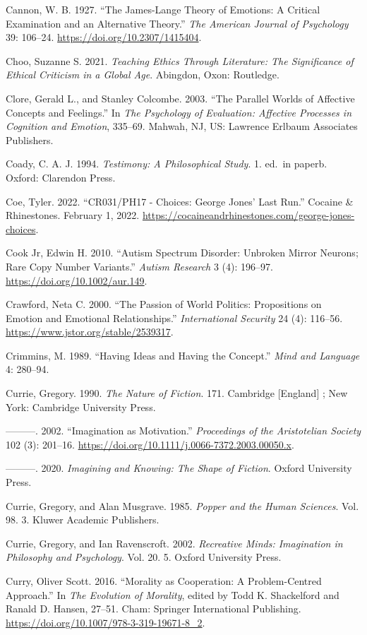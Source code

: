 \documentclass[
  letterpaper,
  DIV=11,
  numbers=noendperiod]{scrartcl}
\theoremstyle{remark}
\begin{document}
Cannon, W. B. 1927. ``The James-Lange Theory of Emotions: A Critical
Examination and an Alternative Theory.'' \emph{The American Journal of
Psychology} 39: 106--24. \url{https://doi.org/10.2307/1415404}.

Choo, Suzanne S. 2021. \emph{Teaching Ethics Through Literature: The
Significance of Ethical Criticism in a Global Age}. Abingdon, Oxon:
Routledge.

Clore, Gerald L., and Stanley Colcombe. 2003. ``The Parallel Worlds of
Affective Concepts and Feelings.'' In \emph{The Psychology of
Evaluation: Affective Processes in Cognition and Emotion}, 335--69.
Mahwah, NJ, US: Lawrence Erlbaum Associates Publishers.

Coady, C. A. J. 1994. \emph{Testimony: A Philosophical Study}. 1. ed.~in
paperb. Oxford: Clarendon Press.

Coe, Tyler. 2022. ``CR031/PH17 - Choices: George Jones' Last Run.''
Cocaine \& Rhinestones. February 1, 2022.
\url{https://cocaineandrhinestones.com/george-jones-choices}.

Cook Jr, Edwin H. 2010. ``Autism Spectrum Disorder: Unbroken Mirror
Neurons; Rare Copy Number Variants.'' \emph{Autism Research} 3 (4):
196--97. \url{https://doi.org/10.1002/aur.149}.

Crawford, Neta C. 2000. ``The Passion of World Politics: Propositions on
Emotion and Emotional Relationships.'' \emph{International Security} 24
(4): 116--56. \url{https://www.jstor.org/stable/2539317}.

Crimmins, M. 1989. ``Having Ideas and Having the Concept.'' \emph{Mind
and Language} 4: 280--94.

Currie, Gregory. 1990. \emph{The Nature of Fiction}. 171. Cambridge
{[}England{]} ; New York: Cambridge University Press.

---------. 2002. ``Imagination as Motivation.'' \emph{Proceedings of the
Aristotelian Society} 102 (3): 201--16.
\url{https://doi.org/10.1111/j.0066-7372.2003.00050.x}.

---------. 2020. \emph{Imagining and Knowing: The Shape of Fiction}.
Oxford University Press.

Currie, Gregory, and Alan Musgrave. 1985. \emph{Popper and the Human
Sciences}. Vol. 98. 3. Kluwer Academic Publishers.

Currie, Gregory, and Ian Ravenscroft. 2002. \emph{Recreative Minds:
Imagination in Philosophy and Psychology}. Vol. 20. 5. Oxford University
Press.

Curry, Oliver Scott. 2016. ``Morality as Cooperation: A Problem-Centred
Approach.'' In \emph{The Evolution of Morality}, edited by Todd K.
Shackelford and Ranald D. Hansen, 27--51. Cham: Springer International
Publishing. \url{https://doi.org/10.1007/978-3-319-19671-8_2}.
\end{document}
